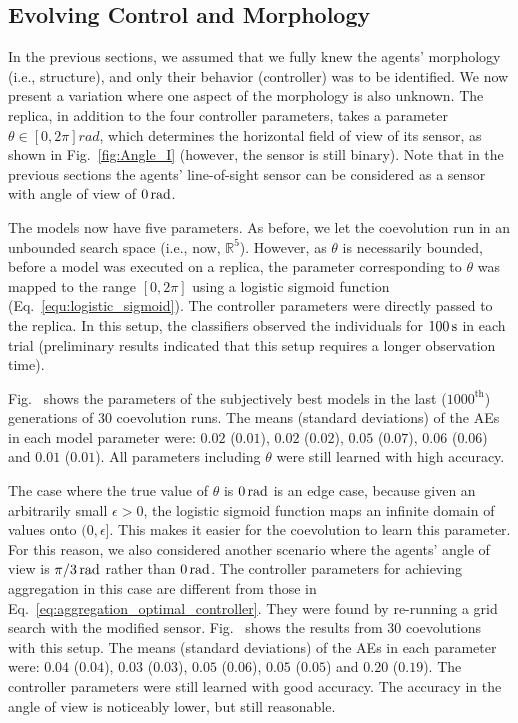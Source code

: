 \subsection{Evolving Control and Morphology}\label{sec:evolving_control_and_morphology_swarm_simulation}
In the previous sections, we assumed that we fully knew the agents' morphology (i.e., structure), and only their behavior (controller) was to be identified. We now present a variation where one aspect of the morphology is also unknown. The replica, in addition to the four controller parameters, takes a parameter $\theta\in\left[0,2\pi\right]\unit{rad}$, which determines the horizontal field of view of its sensor, as shown in Fig.~\ref{fig:Angle_I} (however, the sensor is still binary). Note that in the previous sections the agents' line-of-sight sensor can be considered as a sensor with angle of view of $\unit[0]{rad}$.

The models now have five parameters. As before, we let the coevolution run in an unbounded search space (i.e., now, $\mathbb{R}^5$). However, as $\theta$ is necessarily bounded, before a model was executed on a replica, the parameter corresponding to $\theta$ was mapped to the range $[0, 2\pi]$ using a logistic sigmoid function (Eq.~\eqref{equ:logistic_sigmoid}). The controller parameters were directly passed to the replica. In this setup, the classifiers observed the individuals for $\unit[100]{s}$ in each trial (preliminary results indicated that this setup requires a longer observation time). 

Fig.~ shows the parameters of the subjectively best models in the last ($1000^\textrm{th}$) generations of $30$ coevolution runs. The means (standard deviations) of the AEs in each model parameter were: $0.02$ ($0.01$), $0.02$ ($0.02$), $0.05$ ($0.07$), $0.06$ ($0.06$) and $0.01$ ($0.01$). All parameters including $\theta$ were still learned with high accuracy.

The case where the true value of $\theta$ is $\unit[0]{rad}$ is an edge case, because given an arbitrarily small $\epsilon>0$, the logistic sigmoid function maps an infinite domain of values onto $(0,\epsilon]$. 
This makes it easier for the coevolution to learn this parameter. For this reason, we also considered another scenario where the agents' angle of view is $\unit[\pi/3]{rad}$ rather than $\unit[0]{rad}$. The controller parameters for achieving aggregation in this case are different from those in Eq.~\eqref{eq:aggregation_optimal_controller}. They were found by re-running a grid search with the modified sensor. Fig.~ shows the results from $30$ coevolutions with this setup. The means (standard deviations) of the AEs in each parameter were: $0.04$ ($0.04$), $0.03$ ($0.03$), $0.05$ ($0.06$), $0.05$ ($0.05$) and $0.20$ ($0.19$). The controller parameters were still learned with good accuracy. The accuracy in the angle of view is noticeably lower, but still reasonable.

